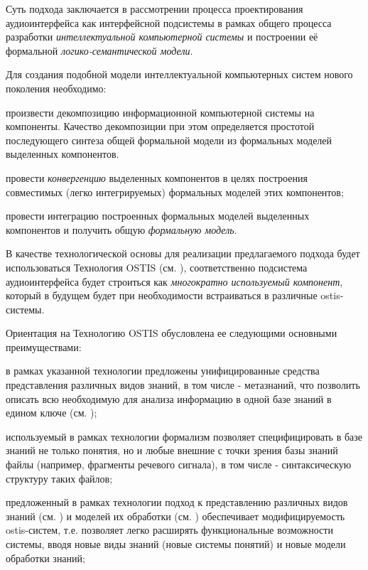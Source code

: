 Суть подхода заключается в рассмотрении процесса проектирования аудиоинтерфейса как интерфейсной подсистемы в рамках общего процесса разработки \textit{интеллектуальной компьютерной системы} и построении её формальной \textit{логико-семантической модели}.

Для создания подобной модели интеллектуальной компьютерных систем нового поколения необходимо:
\begin{textitemize}    
    \item произвести декомпозицию информационной компьютерной системы на компоненты. Качество декомпозиции при этом определяется простотой последующего синтеза общей формальной модели из формальных моделей выделенных компонентов.
    \item провести \textit{конвергенцию} выделенных компонентов в целях построения совместимых (легко интегрируемых) формальных моделей этих компонентов;
    \item провести интеграцию построенных формальных моделей выделенных компонентов и получить общую \textit{формальную модель}.
\end{textitemize}

В качестве технологической основы для реализации предлагаемого подхода будет использоваться Технология OSTIS (см. ), соответственно подсистема аудиоинтерфейса будет строиться как \textit{многократно используемый компонент}, который в будущем будет при необходимости встраиваться в различные ostis-системы.

Ориентация на Технологию OSTIS обусловлена ее следующими основными преимуществами:
\begin{textitemize}
\item в рамках указанной технологии предложены унифицированные средства представления различных видов знаний, в том числе - метазнаний, что позволить описать всю необходимую для анализа информацию в одной базе знаний в едином ключе (см. );
\item используемый в рамках технологии формализм позволяет специфицировать в базе знаний не только понятия, но и любые внешние с точки зрения базы знаний файлы (например, фрагменты речевого сигнала), в том числе - синтаксическую структуру таких файлов;
\item предложенный в рамках технологии подход к представлению различных видов знаний (см. ) и моделей их обработки (см. ) обеспечивает модифицируемость ostis-систем, т.е. позволяет легко расширять функциональные возможности системы, вводя новые виды знаний (новые системы понятий) и новые модели обработки знаний;
\end{textitemize}

